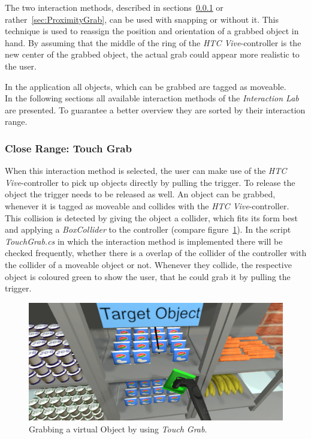 The two interaction methods, described in sections~\ref{sec:TouchGrab} or rather~\ref{sec:ProximityGrab}, can be used with snapping or without it. This technique is used to reassign the position and orientation of a grabbed object in hand. By assuming that the middle of the ring of the \textit{HTC Vive}-controller is the new center of the grabbed object, the actual grab could appear more realistic to the user. 

In the application all objects, which can be grabbed are tagged as moveable.\\

In the following sections all available interaction methods of the \textit{Interaction Lab} are presented. To guarantee a better overview they are sorted by their interaction range. 

\subsubsection{Close Range: Touch Grab} \label{sec:TouchGrab}
When this interaction method is selected, the user can make use of the \textit{HTC Vive}-controller to pick up objects directly by pulling the trigger. To release the object the trigger needs to be released as well. An object can be grabbed, whenever it is tagged as moveable and collides with the \textit{HTC Vive}-controller. This collision is detected by giving the object a collider, which fits its form best \cite{website:BoxCollider}\cite{website:SphereCollider} and applying a \textit{BoxCollider} to the controller (compare figure~\ref{fig:touchGrab}). In the script \textit{TouchGrab.cs} in which the interaction method is implemented there will be checked frequently, whether there is a overlap of the collider of the controller with the collider of a moveable object or not. Whenever they collide, the respective object is coloured green to show the user, that he could grab it by pulling the trigger. 

\begin{figure}[H] 
	\center 
	\includegraphics[width=12cm]{Images/TouchGrab.PNG}			
	\caption[Grabbing a virtual Object by using \textit{Touch Grab}.]{Grabbing a virtual Object by using \textit{Touch Grab}.}
	\label{fig:touchGrab}
\end{figure}

